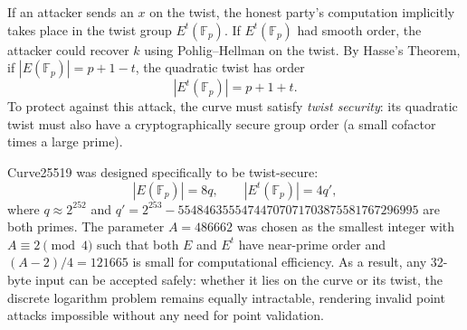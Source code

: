 If an attacker sends an \(x\) on the twist, the honest party's computation implicitly takes place in the twist group \(E^t(\mathbb{F}_p)\).
If \(E^t(\mathbb{F}_p)\) had smooth order, the attacker could recover \(k\) using Pohlig--Hellman on the twist.
By Hasse's Theorem, if \(|E(\mathbb{F}_p)| = p + 1 - t\), the quadratic twist has order
\[
    |E^t(\mathbb{F}_p)| = p + 1 + t.
\]
To protect against this attack, the curve must satisfy \emph{twist security}: its quadratic twist must also have a cryptographically secure group order (a small cofactor times a large prime).

Curve25519 was designed specifically to be twist-secure:
\[
    |E(\mathbb{F}_p)| = 8q, \qquad |E^t(\mathbb{F}_p)| = 4q',
\]
where \(q \approx 2^{252}\) and \(q' = 2^{253} - 55484635554744707071703875581767296995\) are both primes.
The parameter \(A = 486662\) was chosen as the smallest integer with \(A \equiv 2 \pmod 4\) such that both \(E\) and \(E^t\) have near-prime order and \((A - 2)/4 = 121665\) is small for computational efficiency.
As a result, any 32-byte input can be accepted safely: whether it lies on the curve or its twist, the discrete logarithm problem remains equally intractable, rendering invalid point attacks impossible without any need for point validation.
